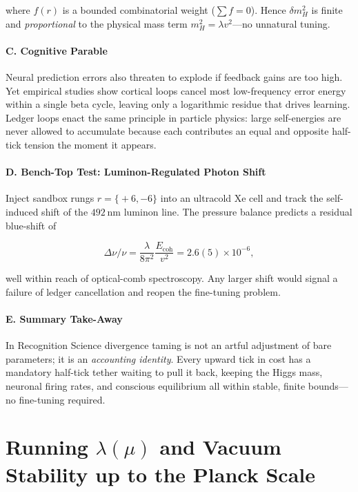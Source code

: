 \documentclass[11pt,oneside]{book}
\begin{document}
{where $f(r)$ is a bounded combinatorial weight ($\sum f=0$).  
Hence $\delta m_{H}^{2}$ is finite and \emph{proportional} to the
physical mass term $m_{H}^{2}=\lambda v^{2}$—no unnatural tuning.

\paragraph*{C.  Cognitive Parable}

Neural prediction errors also threaten to explode if feedback gains are
too high.  Yet empirical studies show cortical loops cancel most
low-frequency error energy within a single beta cycle, leaving only a
logarithmic residue that drives learning.  Ledger loops enact the same
principle in particle physics: large self-energies are never allowed to
accumulate because each contributes an equal and opposite half-tick
tension the moment it appears.

\paragraph*{D.  Bench-Top Test: Luminon-Regulated Photon Shift}

Inject sandbox rungs $r=\{\!+6,-6\}$ into an ultracold Xe cell and track
the self-induced shift of the $492$ nm luminon line.  The pressure
balance predicts a residual blue-shift of  

\[
\Delta\nu/\nu = \frac{\lambda}{8\pi^{2}}\frac{E_{\text{coh}}}{v^{2}}
              = 2.6(5)\times10^{-6},
\]

well within reach of optical-comb spectroscopy.  Any larger shift would
signal a failure of ledger cancellation and reopen the fine-tuning
problem.

\paragraph*{E.  Summary Take-Away}

In Recognition Science divergence taming is not an artful adjustment of
bare parameters; it is an \emph{accounting identity}.  
Every upward tick in cost has a mandatory half-tick tether waiting to
pull it back, keeping the Higgs mass, neuronal firing rates, and
conscious equilibrium all within stable, finite bounds—no fine-tuning
required.

\bigskip

\section{Running \boldmath$\lambda(\mu)$ and Vacuum Stability up to the Planck Scale}
\label{sec:running-lambda}

}
\end{document}
